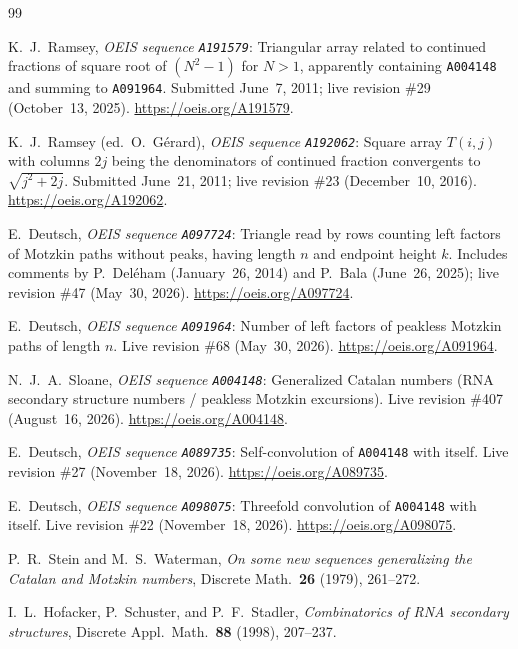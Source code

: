 \documentclass[11pt]{article}
\theoremstyle{definition}
\newcommand{\seq}[1]{\texttt{#1}}
\begin{document}
\begin{thebibliography}{99}
\raggedright

K.~J.\ Ramsey, \emph{OEIS sequence \seq{A191579}}: Triangular array related to continued fractions of square root of $(N^2 - 1)$ for $N > 1$, apparently containing \seq{A004148} and summing to \seq{A091964}. Submitted June~7, 2011; live revision \#29 (October~13, 2025). \url{https://oeis.org/A191579}.

K.~J.\ Ramsey (ed.\ O.\ G\'erard), \emph{OEIS sequence \seq{A192062}}: Square array $T(i, j)$ with columns $2j$ being the denominators of continued fraction convergents to $\sqrt{j^2 + 2j}$. Submitted June~21, 2011; live revision \#23 (December~10, 2016). \url{https://oeis.org/A192062}.

E.\ Deutsch, \emph{OEIS sequence \seq{A097724}}: Triangle read by rows counting left factors of Motzkin paths without peaks, having length $n$ and endpoint height $k$. Includes comments by P.\ Del\'eham (January~26, 2014) and P.\ Bala (June~26, 2025); live revision \#47 (May~30, 2026). \url{https://oeis.org/A097724}.

E.\ Deutsch, \emph{OEIS sequence \seq{A091964}}: Number of left factors of peakless Motzkin paths of length $n$. Live revision \#68 (May~30, 2026). \url{https://oeis.org/A091964}.

N.~J.~A.\ Sloane, \emph{OEIS sequence \seq{A004148}}: Generalized Catalan numbers (RNA secondary structure numbers / peakless Motzkin excursions). Live revision \#407 (August~16, 2026). \url{https://oeis.org/A004148}.

E.\ Deutsch, \emph{OEIS sequence \seq{A089735}}: Self-convolution of \seq{A004148} with itself. Live revision \#27 (November~18, 2026). \url{https://oeis.org/A089735}.

E.\ Deutsch, \emph{OEIS sequence \seq{A098075}}: Threefold convolution of \seq{A004148} with itself. Live revision \#22 (November~18, 2026). \url{https://oeis.org/A098075}.

P.~R.\ Stein and M.~S.\ Waterman, \emph{On some new sequences generalizing the Catalan and Motzkin numbers}, Discrete Math.\ \textbf{26} (1979), 261--272.

I.~L.\ Hofacker, P.\ Schuster, and P.~F.\ Stadler, \emph{Combinatorics of RNA secondary structures}, Discrete Appl.\ Math.\ \textbf{88} (1998), 207--237.


\end{thebibliography}
\end{document}
